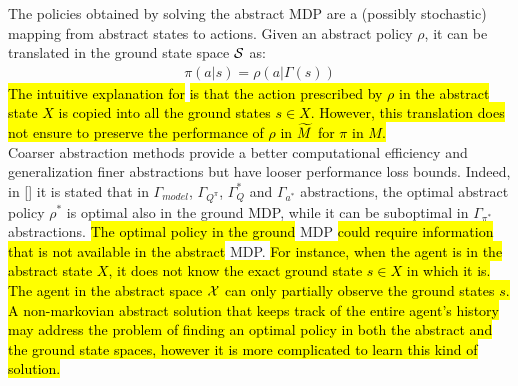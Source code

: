 \newline
The policies obtained by solving the abstract \ac{MDP} are a (possibly stochastic) mapping from abstract states to actions. Given an abstract policy $\rho$, it can be translated in the ground state space $\mathcal{S}$ as: 
\begin{align}
	\pi(a|s) = \rho(a|\Gamma(s)) \label{eq:translation}
\end{align}
\hl{The intuitive explanation for}  \hl{is that the action prescribed by $\rho$ in the abstract state $X$ is copied into all the ground states $s \in X$. However, this translation does not ensure to preserve the performance of $\rho$ in $\widetilde{M}$ for $\pi$ in $M$.}\\
\newline
Coarser abstraction methods provide a better computational efficiency and generalization \wrt finer abstractions but have looser performance loss bounds. Indeed, in [\cite{lihong2006towards}] it is stated that in $\Gamma_{model}$, $\Gamma_{Q^{\pi}}$, $\Gamma_Q^{*}$ and $\Gamma_{a^{*}}$ abstractions, the optimal abstract policy $\rho^{*}$ is optimal also in the ground \ac{MDP}, while it can be suboptimal in $\Gamma_{\pi^{*}}$ abstractions. \hl{The optimal policy in the ground} \ac{MDP} \hl{could require information that is not available in the abstract} \ac{MDP}. \hl{For instance, when the agent is in the abstract state $X$, it does not know the exact ground state $s \in X$ in which it is. The agent in the abstract space $\mathcal{X}$ can only partially observe the ground states $s$. A non-markovian abstract solution that keeps track of the entire agent's history may address the problem of finding an optimal policy in both the abstract and the ground state spaces, however it is more complicated to learn this kind of solution.}


